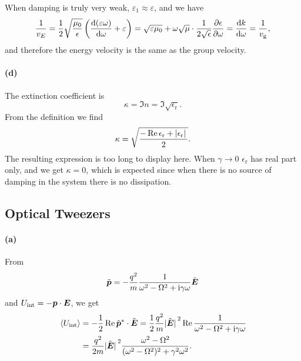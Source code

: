 \documentclass[hyperref, a4paper]{article}
\newcommand*{\ii}{\mathrm{i}}
\newcommand{\epsr}{\epsilon_{\text{r}}}
\begin{document}
When damping is truly very weak, $\varepsilon_1 \approx \varepsilon$,
and we have 
\begin{equation}
    \frac{1}{v_E} = \frac{1}{2} \sqrt{\frac{\mu_0}{\epsilon}} 
    \left(
        \dv{(\varepsilon \omega)}{\omega} + \varepsilon
    \right) 
    = \sqrt{\varepsilon \mu_0} + \omega \sqrt{\mu} \cdot \frac{1}{2 \sqrt{\epsilon}} \pdv{\epsilon}{\omega}
    = \dv{k}{\omega} = \frac{1}{v_{\text{g}}},
\end{equation}
and therefore the energy velocity is the same as the group velocity.

\paragraph{(d)} The extinction coefficient is 
\begin{equation}
    \kappa = \Im n = \Im \sqrt{\epsr}.
\end{equation}
From the definition we find 
\begin{equation}
    \kappa = \sqrt{
        \frac{
            - \Re \epsr + \abs*{\epsr}
        }{2}
    }.
\end{equation}
The resulting expression is too long to display here.
When $\gamma \to 0$ $\epsr$ has real part only, and we get $\kappa = 0$,
which is expected since when there is no source of damping in the system 
there is no dissipation.

\subsection{Optical Tweezers}

\paragraph{(a)} From 
\begin{equation}
    \tilde{\vb*{p}} = - \frac{q^2}{m} \frac{1}{\omega^2 - \Omega^2 + \ii \gamma \omega} \tilde{\vb*{E}}
\end{equation}
and $U_{\text{int}} = - \vb*{p} \cdot \vb*{E}$,
we get 
\begin{equation}
    \begin{aligned}
        \expval*{U_{\text{int}}} &= - \frac{1}{2} \Re \tilde{\vb*{p}}^* \cdot \tilde{\vb*{E}}
        = \frac{1}{2} \frac{q^2}{m} \abs*{\tilde{\vb*{E}}}^2 \Re \frac{1}{
            \omega^2 - \Omega^2 + \ii \gamma \omega
        }  \\
        &= \frac{q^2}{2m} \abs*{\tilde{\vb*{E}}}^2 \frac{
            \omega^2 - \Omega^2
        }{(\omega^2 - \Omega^2)^2 + \gamma^2 \omega^2} .
    \end{aligned}
    \label{eq:u-int-omega-relation-dipole-coupling}
\end{equation}
\end{document}
